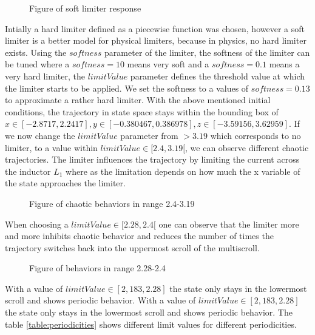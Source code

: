 \documentclass[main]{subfiles}
\begin{document}
\begin{figure}[!h]
\centering
{}
\caption[Figure of soft limiter response]{Figure of soft limiter response}
\label{figure:softlimiterresponse}
\end{figure}

Intially a hard limiter defined as a piecewise function was chosen, however a soft limiter is a better model for physical limiters, because in physics, no hard limiter exists. Using the $softness$ parameter of the limiter, the softness of the limiter can be tuned where a \(softness = 10\) means very soft and a \(softness = 0.1\) means a very hard limiter, the $limitValue$ parameter defines the threshold value at which the limiter starts to be applied. We set the softness to a values of \(softness=0.13\) to approximate a rather hard limiter. With the above mentioned initial conditions, the trajectory in state space stays within the bounding box of \(x \in [-2.8717,2.2417], y \in [-0.380467,0.386978],z \in [-3.59156,3.62959]\).
If we now change the $limitValue$ parameter from \(>3.19\) which corresponds to no limiter, to a value within \(limitValue \in [2.4,3.19[\), we can observe different chaotic trajectories. The limiter influences the trajectory by limiting the current across the inductor \(L_1\) where as the limitation depends on how much the x variable of the state approaches the limiter.

\begin{figure}[!h]
\centering
{}
\caption[Figure of chaotic behaviors in range 2.4-3.19]{Figure of chaotic behaviors in range 2.4-3.19}
\label{figure:chaotictrajectories}
\end{figure}

When choosing a \(limitValue \in [2.28,2.4[\) one can observe that the limiter more and more inhibits chaotic behavior and reduces the number of times the trajectory switches back into the uppermost scroll of the multiscroll. 

\begin{figure}[!h]
\centering
{}
\caption[Figure of behaviors in range 2.28-2.4]{Figure of behaviors in range 2.28-2.4}
\label{figure:chaotictrajectories}
\end{figure}

With a value of \(limitValue \in [2,183, 2.28]\) the state only stays in the lowermost scroll and shows periodic behavior. With a value of \(limitValue \in [2,183, 2.28]\) the state only stays in the lowermost scroll and shows periodic behavior. The table \ref{table:periodicities} shows different limit values for different periodicities.
\end{document}
